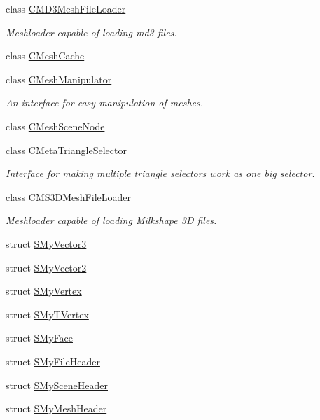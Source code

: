 \begin{DoxyCompactItemize}
class \hyperlink{classirr_1_1scene_1_1_c_m_d3_mesh_file_loader}{C\-M\-D3\-Mesh\-File\-Loader}
\begin{DoxyCompactList}\small\item\em Meshloader capable of loading md3 files. \end{DoxyCompactList}\item 
class \hyperlink{classirr_1_1scene_1_1_c_mesh_cache}{C\-Mesh\-Cache}
\item 
class \hyperlink{classirr_1_1scene_1_1_c_mesh_manipulator}{C\-Mesh\-Manipulator}
\begin{DoxyCompactList}\small\item\em An interface for easy manipulation of meshes. \end{DoxyCompactList}\item 
class \hyperlink{classirr_1_1scene_1_1_c_mesh_scene_node}{C\-Mesh\-Scene\-Node}
\item 
class \hyperlink{classirr_1_1scene_1_1_c_meta_triangle_selector}{C\-Meta\-Triangle\-Selector}
\begin{DoxyCompactList}\small\item\em Interface for making multiple triangle selectors work as one big selector. \end{DoxyCompactList}\item 
class \hyperlink{classirr_1_1scene_1_1_c_m_s3_d_mesh_file_loader}{C\-M\-S3\-D\-Mesh\-File\-Loader}
\begin{DoxyCompactList}\small\item\em Meshloader capable of loading Milkshape 3\-D files. \end{DoxyCompactList}\item 
struct \hyperlink{structirr_1_1scene_1_1_s_my_vector3}{S\-My\-Vector3}
\item 
struct \hyperlink{structirr_1_1scene_1_1_s_my_vector2}{S\-My\-Vector2}
\item 
struct \hyperlink{structirr_1_1scene_1_1_s_my_vertex}{S\-My\-Vertex}
\item 
struct \hyperlink{structirr_1_1scene_1_1_s_my_t_vertex}{S\-My\-T\-Vertex}
\item 
struct \hyperlink{structirr_1_1scene_1_1_s_my_face}{S\-My\-Face}
\item 
struct \hyperlink{structirr_1_1scene_1_1_s_my_file_header}{S\-My\-File\-Header}
\item 
struct \hyperlink{structirr_1_1scene_1_1_s_my_scene_header}{S\-My\-Scene\-Header}
\item 
struct \hyperlink{structirr_1_1scene_1_1_s_my_mesh_header}{S\-My\-Mesh\-Header}

\end{DoxyCompactItemize}
